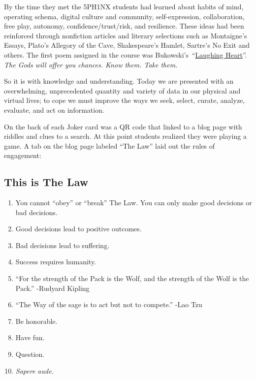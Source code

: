 By the time they met the 5PH1NX students had learned about habits of
mind, operating schema, digital culture and community, self-expression,
collaboration, free play, autonomy, confidence/trust/risk, and
resilience. These ideas had been reinforced through nonfiction articles
and literary selections such as Montaigne's Essays, Plato's Allegory of
the Cave, Shakespeare's Hamlet, Sartre's No Exit and others. The first
poem assigned in the course was
Bukowski's~``\href{http://www.youtube.com/watch?v=bHOHi5ueo0A}{Laughing
Heart}''. \emph{The Gods will offer you chances. Know them. Take them.}

So it is with knowledge and understanding. Today we are presented with
an overwhelming, unprecedented quantity and variety of data in our
physical and virtual lives; to cope we must improve the ways we seek,
select, curate, analyze, evaluate, and act on information.

On the back of each Joker card was a QR code that linked to a blog page
with riddles and clues to a search. At this point students realized they
were playing a game. A tab on the blog page labeled ``The Law'' laid out
the rules of engagement:

\subsection{This is The Law}\label{this-is-the-law}

\begin{enumerate}
\def\labelenumi{\arabic{enumi}.}
\item
  You cannot ``obey'' or ``break'' The Law. You can only make good
  decisions or bad decisions.
\item
  Good decisions lead to positive outcomes.
\item
  Bad decisions lead to suffering.
\item
  Success requires humanity.
\item
  ``For the strength of the Pack is the Wolf, and the strength of the
  Wolf is the Pack.'' -Rudyard Kipling
\item
  ``The Way of the sage is to act but not to compete.'' -Lao Tzu
\item
  Be honorable.
\item
  Have fun.
\item
  Question.
\item
  \emph{Sapere aude}.
\end{enumerate}

